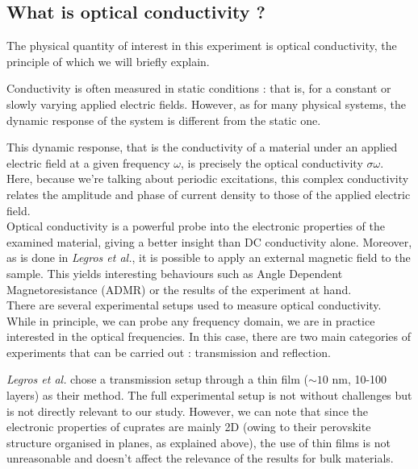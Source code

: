 \subsection{What is optical conductivity ?}
The physical quantity of interest in this experiment is optical conductivity, 
the principle of which we will briefly explain.

Conductivity is often measured in static conditions : 
that is, for a constant or slowly varying applied electric fields. 
However, as for many physical systems, 
the dynamic response of the system is different from the static one. 

This dynamic response, 
that is the conductivity of a material under an applied electric field at a given frequency $\omega$, 
is precisely the optical conductivity $\sigma{\omega}$. 
Here, because we're talking about periodic excitations, this complex conductivity relates the amplitude and phase of current density to those of the applied electric field. \\

Optical conductivity is a powerful probe into the electronic properties of the examined material, 
giving a better insight than DC conductivity alone. 
Moreover, as is done in \textit{Legros et al.}, 
it is possible to apply an external magnetic field to the sample. 
This yields interesting behaviours such as Angle Dependent Magnetoresistance (ADMR) 
or the results of the experiment at hand. \\

There are several experimental setups used to measure optical conductivity. 
While in principle, we can probe any frequency domain, 
we are in practice interested in the optical frequencies. 
In this case, there are two main categories of experiments that can be carried out : 
transmission and reflection. 


\textit{Legros et al.} chose a transmission setup through a thin film ($\sim 10$ nm, 10-100 layers) as their method. 
The full experimental setup is not without challenges but is not directly relevant to our study. 
However, we can note that since the electronic properties of cuprates are mainly 2D 
(owing to their perovskite structure organised in planes, as explained above), 
the use of thin films is not unreasonable 
and doesn't affect the relevance of the results for bulk materials.